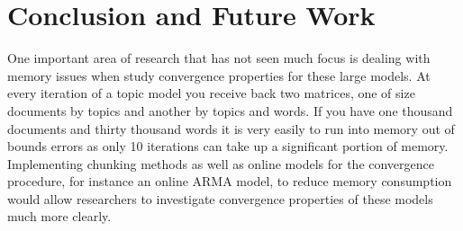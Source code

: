 \documentclass{article}%
\theoremstyle{definition}
\begin{document}
\section{Conclusion and Future Work}
\label{sec:conclusion}

One important area of research that has not seen much focus is dealing with memory issues when study convergence properties for these large models. At every iteration of a topic model you receive back two matrices, one of size documents by topics and another by topics and words. If you have one thousand documents and thirty thousand words it is very easily to run into memory out of bounds errors as only 10 iterations can take up a significant portion of memory. Implementing chunking methods as well as online models for the convergence procedure, for instance an online ARMA model, to reduce memory consumption would allow researchers to investigate convergence properties of these models much more clearly.
\end{document}
